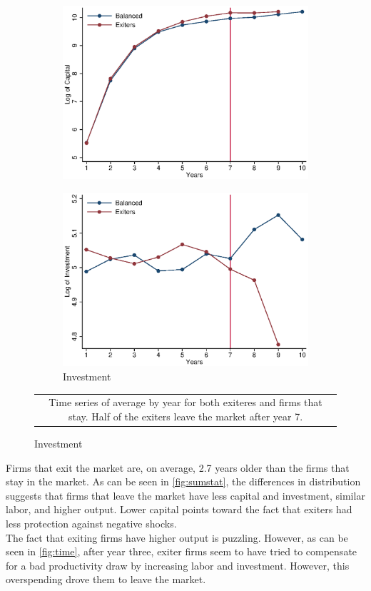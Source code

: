 \documentclass[11pt]{article}
\begin{document}
\begin{figure}[ht]
\begin{subfigure}[b]{.3\textwidth}
		\includegraphics[width=\textwidth]{timeK.eps}
	\end{subfigure}
	\begin{subfigure}[b]{.3\textwidth}
		\centering
		\caption{Investment}
		\includegraphics[width=\textwidth]{timeI.eps}
	\end{subfigure}
\begin{tabular*}{1\textwidth}{c}
	\multicolumn{1}{p{1\hsize}}{\footnotesize Time series of average by year for both exiteres and firms that stay. Half of the exiters leave the market after year 7.}\\
\end{tabular*}      	  
\end{figure}

\newpage

Firms that exit the market are, on average, 2.7 years older than the firms that stay in the market. As can be seen in \autoref{fig:sumstat}, the differences in distribution suggests that firms that leave the market have less capital and investment, similar labor, and higher output. Lower capital points toward the fact that exiters had less protection against negative shocks. \\
The fact that exiting firms have higher output is puzzling. However, as can be seen in \autoref{fig:time}, after year three, exiter firms seem to have tried to compensate for a bad productivity draw by increasing labor and investment. However, this overspending drove them to leave the market.
\end{document}
